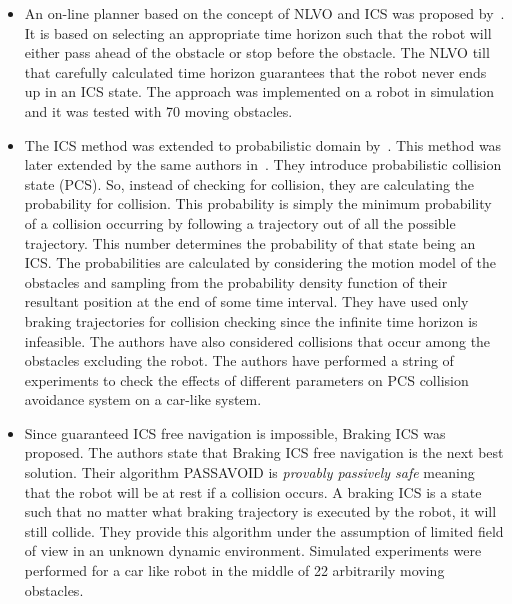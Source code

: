 \begin{itemize}
\item An on-line planner based on the concept of NLVO and ICS was proposed by~\cite{gal2009efficient}\cite{shiller2010nonlinear}. It is based on selecting an appropriate time horizon such that the robot will either pass ahead of the obstacle or stop before the obstacle. The NLVO till that carefully calculated time horizon guarantees that the robot never ends up in an ICS state. The approach was implemented on a robot in simulation and it was tested with 70 moving obstacles. 
\item The ICS method was extended to probabilistic domain by~\cite{althoff2010probabilistic}. This method was later extended by the same authors in~\cite{althoff2012safety}. They introduce probabilistic collision state (PCS). So, instead of checking for collision, they are calculating the probability for collision. This probability is simply the minimum probability of a collision occurring by following a trajectory out of all the possible trajectory. This number determines the probability of that state being an ICS\@. The probabilities are calculated by considering the motion model of the obstacles and sampling from the probability density function of their resultant position at the end of some time interval. They have used only braking trajectories for collision checking since the infinite time horizon is infeasible. The authors have also considered collisions that occur among the obstacles excluding the robot. The authors have performed a string of experiments to check the effects of different parameters on PCS collision avoidance system on a car-like system.
\item Since guaranteed ICS free navigation is impossible, Braking ICS was proposed\cite{bouraine2012provably}. The authors state that Braking ICS free navigation is the next best solution. Their algorithm PASSAVOID is \textit{provably passively safe} meaning that the robot will be at rest if a collision occurs. A braking ICS is a state such that no matter what braking trajectory is executed by the robot, it will still collide. They provide this algorithm under the assumption of limited field of view in an unknown dynamic environment. Simulated experiments were performed for a car like robot in the middle of 22 arbitrarily moving obstacles.

\end{itemize}
